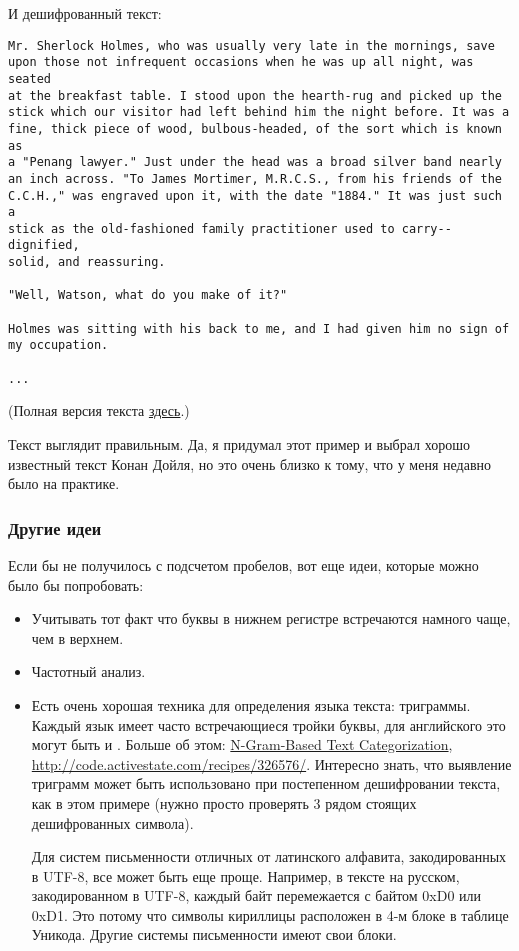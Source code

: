 И дешифрованный текст:

\begin{lstlisting}
Mr. Sherlock Holmes, who was usually very late in the mornings, save
upon those not infrequent occasions when he was up all night, was seated
at the breakfast table. I stood upon the hearth-rug and picked up the
stick which our visitor had left behind him the night before. It was a
fine, thick piece of wood, bulbous-headed, of the sort which is known as
a "Penang lawyer." Just under the head was a broad silver band nearly
an inch across. "To James Mortimer, M.R.C.S., from his friends of the
C.C.H.," was engraved upon it, with the date "1884." It was just such a
stick as the old-fashioned family practitioner used to carry--dignified,
solid, and reassuring.

"Well, Watson, what do you make of it?"

Holmes was sitting with his back to me, and I had given him no sign of
my occupation.

...
\end{lstlisting}

(Полная версия текста \href{\RepoURL/ff/XOR/mask_2/files/plain.txt}{здесь}.)

Текст выглядит правильным.
Да, я придумал этот пример и выбрал хорошо известный текст Конан Дойля, но это очень близко к тому,
что у меня недавно было на практике.

\subsubsection{Другие идеи}

Если бы не получилось с подсчетом пробелов, вот еще идеи, которые можно было бы попробовать:

\begin{itemize}

\item Учитывать тот факт что буквы в нижнем регистре встречаются намного чаще, чем в верхнем.

\item Частотный анализ.

\item Есть очень хорошая техника для определения языка текста: триграммы.
Каждый язык имеет часто встречающиеся тройки буквы, для английского это могут быть  и .
Больше об этом:
\href{http://odur.let.rug.nl/~vannoord/TextCat/textcat.pdf}{N-Gram-Based Text Categorization},
\url{http://code.activestate.com/recipes/326576/}.
Интересно знать, что выявление триграмм может быть использовано при постепенном дешифровании текста, как в этом примере
(нужно просто проверять 3 рядом стоящих дешифрованных символа).

Для систем письменности отличных от латинского алфавита, закодированных в UTF-8, все может быть еще проще.
Например, в тексте на русском, закодированном в UTF-8, каждый байт перемежается с байтом 0xD0 или 0xD1.
Это потому что символы кириллицы расположен в 4-м блоке в таблице Уникода.
Другие системы письменности имеют свои блоки.

\end{itemize}

